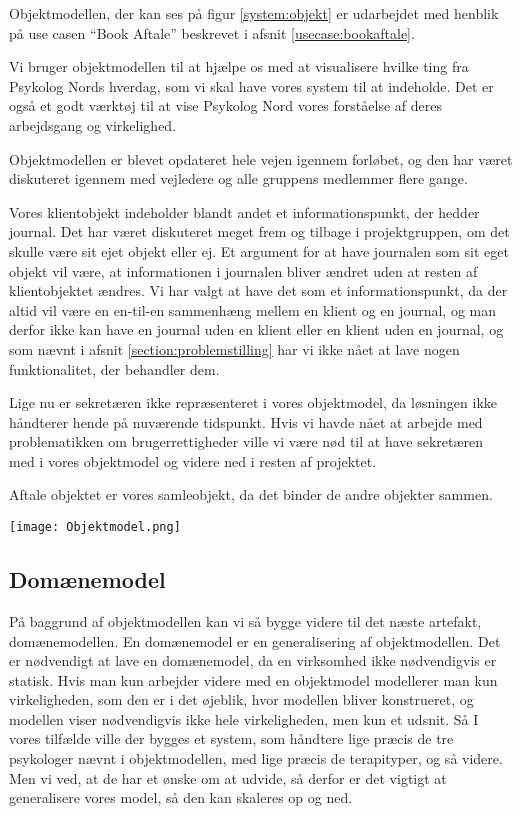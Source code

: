 Objektmodellen, der kan ses på figur \ref{system:objekt} er udarbejdet med henblik på use casen ``Book Aftale'' beskrevet i afsnit \ref{usecase:bookaftale}.

Vi bruger objektmodellen til at hjælpe os med at visualisere hvilke ting fra Psykolog Nords hverdag, som vi skal have vores system til at indeholde.
Det er også et godt værktøj til at vise Psykolog Nord vores forståelse af deres arbejdsgang og virkelighed.

Objektmodellen er blevet opdateret hele vejen igennem forløbet, og den har været diskuteret igennem med vejledere og alle gruppens medlemmer flere gange.

Vores klientobjekt indeholder blandt andet et informationspunkt, der hedder journal.
Det har været diskuteret meget frem og tilbage i projektgruppen, om det skulle være sit ejet objekt eller ej.
Et argument for at have journalen som sit eget objekt vil være, at informationen i journalen bliver ændret uden at resten af klientobjektet ændres.
Vi har valgt at have det som et informationspunkt, da der altid vil være en en-til-en sammenhæng mellem en klient og en journal, og man derfor ikke kan have en journal uden en klient eller en klient uden en journal, og som nævnt i afsnit \ref{section:problemstilling} har vi ikke nået at lave nogen funktionalitet, der behandler dem.

Lige nu er sekretæren ikke repræsenteret i vores objektmodel, da løsningen ikke håndterer hende på nuværende tidspunkt.
Hvis vi havde nået at arbejde med problematikken om brugerrettigheder ville vi være nød til at have sekretæren med i vores objektmodel og videre ned i resten af projektet.

Aftale objektet er vores samleobjekt, da det binder de andre objekter sammen.

\begin{sidewaysfigure}
    \caption{Objektmodel for Book Aftale}
    \centering
        \texttt{[image: Objektmodel.png]}
    \label{system:objekt}
\end{sidewaysfigure}

\subsection{Domænemodel}
\label{domaenemodel}

På baggrund af objektmodellen kan vi så bygge videre til det næste artefakt, domænemodellen.
En domænemodel er en generalisering af objektmodellen.
Det er nødvendigt at lave en domænemodel, da en virksomhed ikke nødvendigvis er statisk.
Hvis man kun arbejder videre med en objektmodel modellerer man kun virkeligheden, som den er i det øjeblik, hvor modellen bliver konstrueret, og modellen viser nødvendigvis ikke hele virkeligheden, men kun et udsnit.
Så I vores tilfælde ville der bygges et system, som håndtere lige præcis de tre psykologer nævnt i objektmodellen, med lige præcis de terapityper, og så videre.
Men vi ved, at de har et ønske om at udvide, så derfor er det vigtigt at generalisere vores model, så den kan skaleres op og ned.

